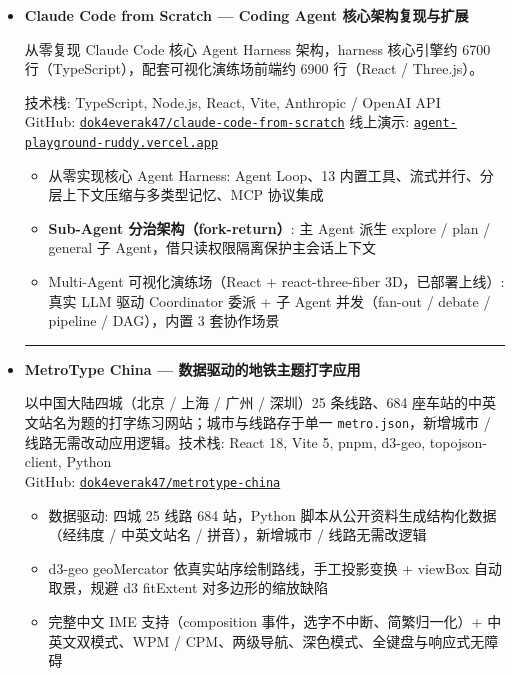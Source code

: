 \documentclass[zh]{resume}
\begin{document}
\begin{itemize}
            \item[\faCode] \textbf{Claude Code from Scratch — Coding Agent 核心架构复现与扩展}

    从零复现 Claude Code 核心 Agent Harness 架构，harness 核心引擎约 6700 行（TypeScript），配套可视化演练场前端约 6900 行（React / Three.js）。

    技术栈: TypeScript, Node.js, React, Vite, Anthropic / OpenAI API \\
    GitHub: \href{https://github.com/dok4everak47/claude-code-from-scratch}{\texttt{dok4everak47/claude-code-from-scratch}} \quad 线上演示: \href{https://agent-playground-ruddy.vercel.app}{\texttt{agent-playground-ruddy.vercel.app}}
    \begin{itemize}
        \item 从零实现核心 Agent Harness: Agent Loop、13 内置工具、流式并行、分层上下文压缩与多类型记忆、MCP 协议集成
        \item \textbf{Sub-Agent 分治架构（fork-return）}: 主 Agent 派生 explore / plan / general 子 Agent，借只读权限隔离保护主会话上下文
        \item Multi-Agent 可视化演练场（React + react-three-fiber 3D，已部署上线）: 真实 LLM 驱动 Coordinator 委派 + 子 Agent 并发（fan-out / debate / pipeline / DAG），内置 3 套协作场景
    \end{itemize}

    \vspace{0.6ex}
    {\color{accentcolor!15}\hrule}
    \vspace{0.6ex}

    \item[\faCode] \textbf{MetroType China — 数据驱动的地铁主题打字应用}

    以中国大陆四城（北京 / 上海 / 广州 / 深圳）25 条线路、684 座车站的中英文站名为题的打字练习网站；城市与线路存于单一 \texttt{metro.json}，新增城市 / 线路无需改动应用逻辑。技术栈: React 18, Vite 5, pnpm, d3-geo, topojson-client, Python \\
    GitHub: \href{https://github.com/dok4everak47/metrotype-china}{\texttt{dok4everak47/metrotype-china}}
    \begin{itemize}
        \item 数据驱动: 四城 25 线路 684 站，Python 脚本从公开资料生成结构化数据（经纬度 / 中英文站名 / 拼音），新增城市 / 线路无需改逻辑
        \item d3-geo geoMercator 依真实站序绘制路线，手工投影变换 + viewBox 自动取景，规避 d3 fitExtent 对多边形的缩放缺陷
        \item 完整中文 IME 支持（composition 事件，选字不中断、简繁归一化）+ 中英文双模式、WPM / CPM、两级导航、深色模式、全键盘与响应式无障碍
    \end{itemize}
\end{itemize}
\end{document}
